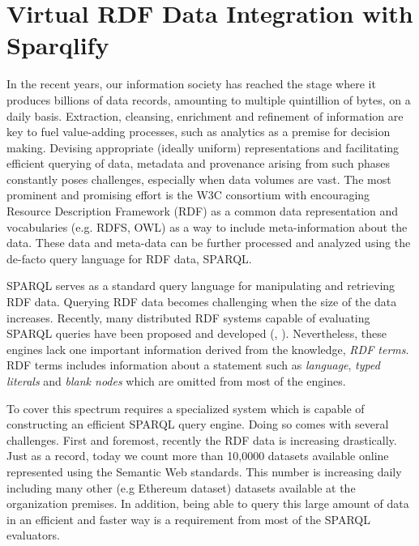 
\section{Virtual RDF Data Integration with Sparqlify}
\label{sec:intro}
In the recent years, our information society has reached the stage where it produces billions of data records, amounting to multiple quintillion of bytes, on a daily basis.
Extraction, cleansing, enrichment and refinement of information are key to fuel value-adding processes, such as analytics as a premise for decision making.
Devising appropriate (ideally uniform) representations and facilitating efficient querying of data, metadata and provenance arising from such phases constantly poses challenges, especially when data volumes are vast. %
The most prominent and promising effort is the W3C consortium with encouraging Resource Description Framework (RDF) as a common data representation and vocabularies (e.g. RDFS, OWL) as a way to include meta-information about the data.
These data and meta-data can be further processed and analyzed using the de-facto query language for RDF data, SPARQL.

SPARQL serves as a standard query language for manipulating and retrieving RDF data.
Querying RDF data becomes challenging when the size of the data increases.
Recently, many distributed RDF systems capable of evaluating SPARQL queries have been proposed and developed (\cite{Schatzle:2016:SRQ:2977797.2977806}, \cite{sparqlgx-iswc-2016}).
Nevertheless, these engines lack one important information derived from the knowledge, \emph{RDF terms}.
RDF terms includes information about a statement such as \emph{language}, \emph{typed literals} and \emph{blank nodes} which are omitted from most of the engines.

To cover this spectrum requires a specialized system which is capable of constructing an efficient SPARQL query engine.
Doing so comes with several challenges.
First and foremost, recently the RDF data is increasing drastically.
Just as a record, today we count more than 10,0000 datasets available online represented using the Semantic Web standards.
This number is increasing daily including many other (e.g Ethereum dataset) datasets available at the organization premises.
In addition, being able to query this large amount of data in an efficient and faster way is a requirement from most of the SPARQL evaluators.


